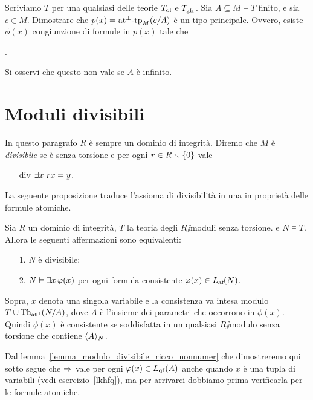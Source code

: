\begin{exercise}\label{ex_ol+grf_tipi_princ_comp}
Scriviamo $T$ per una qualsiasi delle teorie $T_{\rm ol}$ e $T_{\rm gfr}$. Sia $A\subseteq M\models T$ finito, e sia $c\in M$. Dimostrare che $p(x)=\pmatp_M(c/A)$ \`e un tipo principale. Ovvero, esiste $\phi(x)$ congiunzione di formule in $p(x)$ tale che

.

Si osservi che questo non vale se $A$ \`e infinito.\QED
\end{exercise}




\section{Moduli divisibili}

In questo paragrafo $R$ \`e sempre un dominio di integrit\`a. Diremo che $M$ \`e \emph{divisibile\/} se \`e senza torsione e per ogni  $r\in R\sm \{0\}$ vale
\begin{itemize}
\item[div] $\E x\ rx=y$.
\end{itemize} 

La seguente proposizione traduce l'assioma di divisibilit\`a in una in propriet\`a delle formule atomiche.

\begin{proposition}\label{prop_md_cons_sodd}
Sia $R$ un dominio di integrit\`a, $T$ la teoria degli $R\jj$moduli senza torsione. e $N\models T$. Allora le seguenti affermazioni sono equivalenti:
\begin{itemize}
\item[1.] $N$ \`e divisibile;
\item[2.] $N\models\E x\,\phi(x)$ per ogni formula consistente $\phi(x)\in\aL(N)$.
\end{itemize} 
Sopra, $x$ denota una singola variabile e la consistenza va intesa modulo $T\cup\Diag(N/A)$, dove $A$ \`e l'insieme dei parametri che occorrono in $\phi(x)$. Quindi $\phi(x)$ \`e consistente se soddisfatta in un qualsiasi $R\jj$modulo senza torsione che contiene $\<A\>_N$.
\end{proposition}

Dal lemma~\ref{lemma_modulo_divisibile_ricco_nonnumer} che dimostreremo qui sotto segue che $\IMP$ vale per ogni $\phi(x)\in L_{\rm qf}(A)$ anche quando $x$ \`e una tupla di variabili (vedi esercizio~\ref{lkhfq}), ma per arrivarci dobbiamo prima verificarla per le formule atomiche. 

